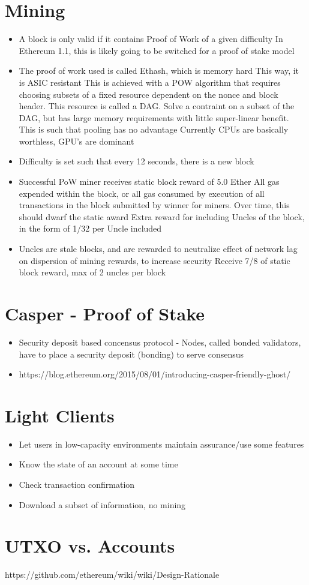 \documentclass{article}
\begin{document}
\section*{Mining}
\begin{itemize}
  \item A block is only valid if it contains Proof of Work of a given difficulty
    \subitem In Ethereum 1.1, this is likely going to be switched for a proof of stake model
  \item The proof of work used is called Ethash, which is memory hard
    \subitem This way, it is ASIC resistant
    \subitem This is achieved with a POW algorithm that requires choosing subsets of a fixed resource dependent on the nonce and block header.
    \subitem This resource is called a DAG. 
    \subitem Solve a contraint on a subset of the DAG, but has large memory requirements with little super-linear benefit. This is such that pooling has no advantage
    \subitem Currently CPUs are basically worthless, GPU's are dominant
  \item Difficulty is set such that every 12 seconds, there is a new block
  \item Successful PoW miner receives 
    \subitem static block reward of 5.0 Ether
    \subitem All gas expended within the block, or all gas consumed by execution of all transactions in the block submitted by winner for miners. Over time, this should
    dwarf the static award
    \subitem Extra reward for including Uncles of the block, in the form of 1/32 per Uncle included
  \item Uncles are stale blocks, and are rewarded to neutralize effect of network lag on dispersion of mining rewards, to increase security
    \subitem Receive 7/8 of static block reward, max of 2 uncles per block
\end{itemize}

\section*{Casper - Proof of Stake}
\begin{itemize}
  \item Security deposit based concensus protocol - Nodes, called bonded validators, have to place a security deposit (bonding) to serve consensus
  \item https://blog.ethereum.org/2015/08/01/introducing-casper-friendly-ghost/
\end{itemize}

\section*{Light Clients}
\begin{itemize}
  \item Let users in low-capacity environments maintain assurance/use some features
  \item Know the state of an account at some time
  \item Check transaction confirmation
  \item Download a subset of information, no mining
\end{itemize}


\section*{UTXO vs. Accounts}
https://github.com/ethereum/wiki/wiki/Design-Rationale
\end{document}
